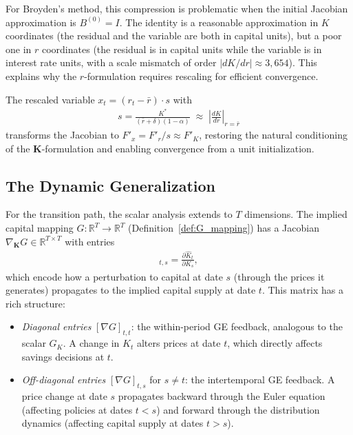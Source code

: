 \documentclass[12pt]{article}
\newcommand{\R}{\mathbb{R}}
\begin{document}
For Broyden's method, this compression is problematic when the initial Jacobian approximation is $B^{(0)} = I$. The identity is a reasonable approximation in $K$ coordinates (the residual and the variable are both in capital units), but a poor one in $r$ coordinates (the residual is in capital units while the variable is in interest rate units, with a scale mismatch of order $|dK/dr| \approx 3{,}654$). This explains why the $r$-formulation requires rescaling for efficient convergence.

The rescaled variable $x_t = (r_t - \bar{r}) \cdot s$ with
\begin{align}
    s = \frac{K^*}{(\bar{r} + \delta)(1-\alpha)} \;\approx\; \left|\frac{dK}{dr}\right|_{r = \bar{r}} \label{eq:rescaling}
\end{align}
transforms the Jacobian to $F'_x = F'_r / s \approx F'_K$, restoring the natural conditioning of the $\mathbf{K}$-formulation and enabling convergence from a unit initialization.

\subsection{The Dynamic Generalization}
\label{ssec:dynamic_generalization}

For the transition path, the scalar analysis extends to $T$ dimensions. The implied capital mapping $G: \R^T \to \R^T$ (Definition~\ref{def:G_mapping}) has a Jacobian $\nabla_\mathbf{K} G \in \R^{T \times T}$ with entries
\begin{align}
    [\nabla G]_{t,s} = \frac{\partial \hat{K}_t}{\partial K_s}, \label{eq:jacobian_dynamic}
\end{align}
which encode how a perturbation to capital at date $s$ (through the prices it generates) propagates to the implied capital supply at date $t$. This matrix has a rich structure:
\begin{itemize}[nosep]
    \item \emph{Diagonal entries} $[\nabla G]_{t,t}$: the within-period GE feedback, analogous to the scalar $G_K$. A change in $K_t$ alters prices at date $t$, which directly affects savings decisions at $t$.
    \item \emph{Off-diagonal entries} $[\nabla G]_{t,s}$ for $s \neq t$: the intertemporal GE feedback. A price change at date $s$ propagates backward through the Euler equation (affecting policies at dates $t < s$) and forward through the distribution dynamics (affecting capital supply at dates $t > s$).
\end{itemize}
\end{document}
